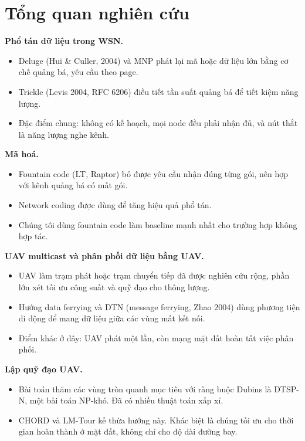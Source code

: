 \section{Tổng quan nghiên cứu}

\textbf{Phổ tán dữ liệu trong WSN.}

\begin{itemize}
\tightlist
\item
  Deluge (Hui \& Culler, 2004) và MNP phát lại mã hoặc dữ liệu lớn bằng
  cơ chế quảng bá, yêu cầu theo page.
\item
  Trickle (Levis 2004, RFC 6206) điều tiết tần suất quảng bá để tiết
  kiệm năng lượng.
\item
  Đặc điểm chung: không có kế hoạch, mọi node đều phải nhận đủ, và nút
  thắt là năng lượng nghe kênh.
\end{itemize}

\textbf{Mã hoá.}

\begin{itemize}
\tightlist
\item
  Fountain code (LT, Raptor) bỏ được yêu cầu nhận đúng từng gói, nên hợp
  với kênh quảng bá có mất gói.
\item
  Network coding được dùng để tăng hiệu quả phổ tán.
\item
  Chúng tôi dùng fountain code làm baseline mạnh nhất cho trường hợp
  không hợp tác.
\end{itemize}

\textbf{UAV multicast và phân phối dữ liệu bằng UAV.}

\begin{itemize}
\tightlist
\item
  UAV làm trạm phát hoặc trạm chuyển tiếp đã được nghiên cứu rộng, phần
  lớn xét tối ưu công suất và quỹ đạo cho thông lượng.
\item
  Hướng data ferrying và DTN (message ferrying, Zhao 2004) dùng phương
  tiện di động để mang dữ liệu giữa các vùng mất kết nối.
\item
  Điểm khác ở đây: UAV phát một lần, còn mạng mặt đất hoàn tất việc phân
  phối.
\end{itemize}

\textbf{Lập quỹ đạo UAV.}

\begin{itemize}
\tightlist
\item
  Bài toán thăm các vùng tròn quanh mục tiêu với ràng buộc Dubins là
  DTSP-N, một bài toán NP-khó. Đã có nhiều thuật toán xấp xỉ.
\item
  CHORD và LM-Tour kế thừa hướng này. Khác biệt là chúng tối ưu cho thời
  gian hoàn thành ở mặt đất, không chỉ cho độ dài đường bay.
\end{itemize}

